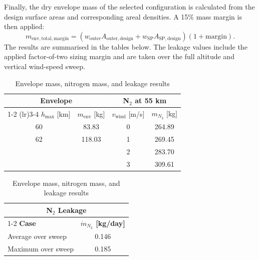 Finally, the dry envelope mass of the selected configuration is calculated from the design surface areas and corresponding areal densities. A 15\% mass margin is then applied:
\begin{equation}
    m_{\mathrm{env,total,margin}}
    =
    \left(
    w_{\mathrm{outer}}A_{\mathrm{outer,design}}
    +
    w_{\mathrm{SP}}A_{\mathrm{SP,design}}
    \right)
    (1+\mathrm{margin}) .
\end{equation}
The results are summarised in the tables below. The leakage values include the applied factor-of-two sizing margin and are taken over the full altitude and vertical wind-speed sweep.


\begin{table}[H]
\centering
\caption{Envelope mass, nitrogen mass, and leakage results}
\label{tab:mass_and_leakage_results}
\renewcommand{\arraystretch}{1.08}
\small

\begin{minipage}{0.56\textwidth}
\centering
\begin{tabular}{cc@{\quad}cc}
\toprule
\multicolumn{2}{c}{\textbf{Envelope}} &
\multicolumn{2}{c}{\textbf{N$_2$ at 55 km}} \\
\cmidrule(lr){1-2} \cmidrule(lr){3-4}
$h_{\max}$ [km] & $m_{\mathrm{env}}$ [kg] &
$v_{\mathrm{wind}}$ [m/s] & $m_{N_2}$ [kg] \\
\midrule
60 & 83.83  & 0 & 264.89 \\
62 & 118.03 & 1 & 269.45 \\
   &        & 2 & 283.70 \\
   &        & 3 & 309.61 \\
\bottomrule
\end{tabular}
\end{minipage}
\hfill
\begin{minipage}{0.38\textwidth}
\centering
\begin{tabular}{lc}
\toprule
\multicolumn{2}{c}{\textbf{N$_2$ Leakage}} \\
\cmidrule(lr){1-2}
\textbf{Case} & \textbf{$\dot{m}_{N_2}$ [kg/day]} \\
\midrule
Average over sweep & 0.146 \\
Maximum over sweep & 0.185 \\
\bottomrule
\end{tabular}
\end{minipage}

\end{table}

